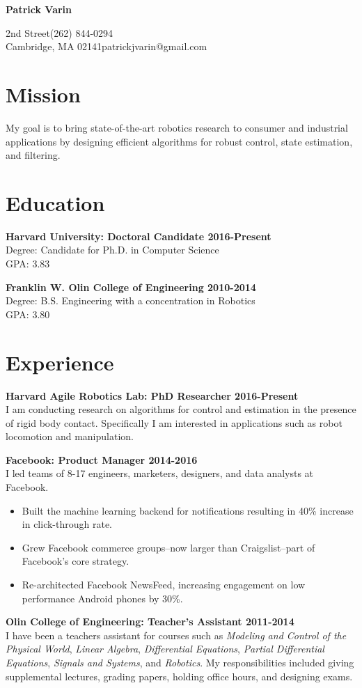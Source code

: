 \documentclass{article}
\newcommand{\name}[1]{\begin{center}\huge\textbf{#1}\end{center}\vspace{2em}}
\newcommand{\personal}[4]{
	\noindent#1\hfill#3\\
	#2\hfill#4
}
\newcommand{\newitem}[2]{\noindent\textbf{#1 \hfill #2}\\}
\newcommand{\gimmespace}{\vspace{1em}}
\begin{document}
\name{Patrick Varin}
\personal{38 2nd Street}{Cambridge, MA 02141}{(262) 844-0294}{patrickjvarin@gmail.com}
\section*{Mission}
\noindent My goal is to bring state-of-the-art robotics research to consumer and industrial applications by designing efficient algorithms for robust control, state estimation, and filtering.

\section*{Education}
\newitem{Harvard University: Doctoral Candidate}{2016-Present}
Degree: Candidate for Ph.D. in Computer Science\\
GPA: 3.83
\gimmespace

\newitem{Franklin W. Olin College of Engineering}{2010-2014}
Degree: B.S. Engineering with a concentration in Robotics\\
GPA: 3.80

\section*{Experience}

\newitem{Harvard Agile Robotics Lab: PhD Researcher}{2016-Present}
I am conducting research on algorithms for control and estimation in the presence of rigid body contact. Specifically I am interested in applications such as robot locomotion and manipulation.
\gimmespace

\newitem{Facebook: Product Manager}{2014-2016}
I led teams of 8-17 engineers, marketers, designers, and data analysts at Facebook.
\begin{itemize}
\item Built the machine learning backend for notifications resulting in 40\% increase in click-through rate.
\item Grew Facebook commerce groups--now larger than Craigslist--part of Facebook's core strategy.
\item Re-architected Facebook NewsFeed, increasing engagement on low performance Android phones by 30\%.
\end{itemize}
\gimmespace

\newitem{Olin College of Engineering: Teacher's Assistant}{2011-2014}
I have been a teachers assistant for courses such as \emph{Modeling and Control of the Physical World}, \emph{Linear Algebra}, \emph{Differential Equations}, \emph{Partial Differential Equations}, \emph{Signals and Systems}, and \emph{Robotics}. My responsibilities included giving supplemental lectures, grading papers, holding office hours, and designing exams.
\gimmespace
\end{document}
